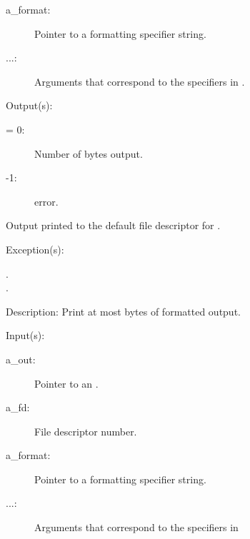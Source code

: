 \begin{capi}
\begin{capilist}
\begin{description}
		\item[a\_format: ]
			Pointer to a formatting specifier string.
		\item[...: ]
			Arguments that correspond to the specifiers in
			.
		\end{description}
	\item[Output(s): ]
		\begin{description}\item[]
		\item[retval: ]
			\begin{description}\item[]
			\item[{\gt}= 0: ]
				Number of bytes output.
			\item[-1: ]
				 error.
			\end{description}
		\item{Output printed to the default file descriptor for
			.}
		\end{description}
	\item[Exception(s): ]
		\begin{description}\item[]
		\item[.]
		\item[.]
		\end{description}
	\item[Description: ]
		Print at most  bytes of formatted output.
	\end{capilist}
\label{out_put_f}
\label{_cw_out_put_f}
	\begin{capilist}
	\item[Input(s): ]
		\begin{description}\item[]
		\item[a\_out: ]
			Pointer to an .
		\item[a\_fd: ]
			File descriptor number.
		\item[a\_format: ]
			Pointer to a formatting specifier string.
		\item[...: ]
			Arguments that correspond to the specifiers in

\end{description}
\end{capilist}
\end{capi}
